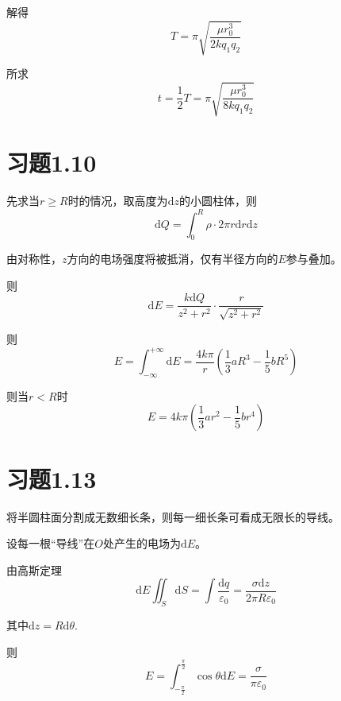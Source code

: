 \documentclass{SCIS2020cn}
\begin{document}
解得
\begin{equation}
    T=\pi\sqrt{\frac{\mu{r_0^3}}{2kq_1q_2}}
\end{equation}

所求
\begin{equation}
    t=\frac{1}{2}T=\pi\sqrt{\frac{\mu{r_0^3}}{8kq_1q_2}}
\end{equation}

\section{习题1.10}
先求当$r\geq{}R$时的情况，取高度为$\text{d}z$的小圆柱体，则
\begin{equation}
    \displaystyle\text{d}Q=\int_0^R\rho·2\pi{}r\text{d}r\text{d}z
\end{equation}


由对称性，$z$方向的电场强度将被抵消，仅有半径方向的$E$参与叠加。

则
\begin{equation}
    \text{d}E=\frac{k\text{d}Q}{{z^2+r^2}}·\frac{r}{\sqrt{z^2+r^2}}
\end{equation}

则
\begin{equation}
    E=\int_{-\infty}^{+\infty}\text{d}E=\frac{4k\pi}{r}\left(\frac{1}{3}aR^3-\frac{1}{5}bR^5\right)
\end{equation}

则当$r<R$时
\begin{equation}
    E=4k\pi\left(\frac{1}{3}ar^2-\frac{1}{5}br^4\right)
\end{equation}

\section{习题1.13}
将半圆柱面分割成无数细长条，则每一细长条可看成无限长的导线。

设每一根“导线”在$O$处产生的电场为$\text{d}E$。

由高斯定理
\begin{equation}
    \text{d}E\iint_S\text{d}S=\int\frac{{\text{d}q}}{\varepsilon_0}=\frac{\sigma\text{d}z}{2\pi{}R\varepsilon_0}
\end{equation}

其中$\text{d}z=R\text{d}\theta$.

则
\begin{equation}
    E=\int_{-\frac{\pi}{2}}^{\frac{\pi}{2}}\cos{\theta}\text{d}E=\frac{\sigma}{\pi\varepsilon_0}
\end{equation}
\end{document}
